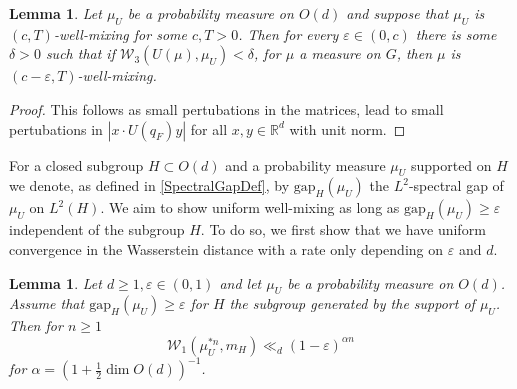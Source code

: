 \documentclass[10pt, english,oneside,reqno]{amsart}
\theoremstyle{plain}
\newtheorem{lemma}[theorem]{Lemma}
\theoremstyle{remark}
\numberwithin{equation}{section}
\numberwithin{figure}{section}
\newcommand{\eps}{\varepsilon}
\newcommand{\Haarof}[1]{m_{#1}}
\begin{document}
\begin{lemma}\label{MixingContinuity}
    Let $\mu_U$ be a probability measure on $O(d)$ and suppose that $\mu_U$ is $(c, T)$-well-mixing for some $c, T > 0$. Then for every $\varepsilon \in (0, c)$ there is some $\delta > 0$ such that if $\mathcal{W}_3(U(\mu), \mu_U) < \delta$, for $\mu$ a measure on $G$, then $\mu$ is $(c - \varepsilon, T)$-well-mixing.
\end{lemma}

\begin{proof}
    This follows as small pertubations in the matrices, lead to small pertubations in $|x\cdot U(q_F)y|$ for all $x,y \in \mathbb{R}^d$ with unit norm.
\end{proof}

For a closed subgroup $H \subset O(d)$ and a probability measure $\mu_U$ supported on $H$ we denote, as defined in \eqref{SpectralGapDef}, by $\mathrm{gap}_H(\mu_U)$ the $L^2$-spectral gap of $\mu_U$ on $L^2(H)$. We aim to show uniform well-mixing as long as $\mathrm{gap}_H(\mu_U) \geq \eps$ independent of the subgroup $H$. To do so, we first show that we have uniform convergence in the Wasserstein distance with a rate only depending on $\eps$ and $d$.

\begin{lemma}\label{GapWassersteinConvergence}
    Let $d\geq 1, \eps \in (0,1)$ and let $\mu_U$ be a probability measure on $O(d)$. Assume that $\mathrm{gap}_H(\mu_U) \geq \eps$ for $H$ the subgroup generated by the support of $\mu_U$. Then for $n\geq 1$ $$\mathcal{W}_1(\mu_U^{*n}, \Haarof{H}) \ll_d (1-\eps)^{\alpha n}$$ for $\alpha = (1 + \frac{1}{2}\dim O(d))^{-1}$.
\end{lemma}
\end{document}
